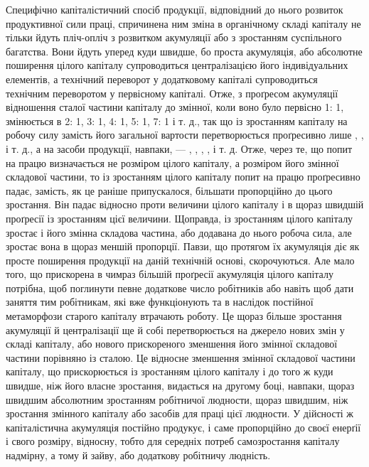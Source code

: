 Специфічно капіталістичний спосіб продукції, відповідний
до нього розвиток продуктивної сили праці, спричинена ним
зміна в органічному складі капіталу не тільки йдуть пліч-опліч
з розвитком акумуляції або з зростанням суспільного багатства.
Вони йдуть уперед куди швидше, бо проста акумуляція,
або абсолютне поширення цілого капіталу супроводиться централізацією
його індивідуальних елементів, а технічний переворот
у додатковому капіталі супроводиться технічним переворотом
у первісному капіталі. Отже, з проґресом акумуляції
відношення сталої частини капіталу до змінної, коли воно було
первісно 1: 1, змінюється в 2: 1, 3: 1, 4: 1, 5: 1, 7: 1 і т. д.,
так що із зростанням капіталу на робочу силу замість  його
загальної вартости перетворюється проґресивно лише , ,
   і т. д., а на засоби продукції, навпаки, — , , ,
,  і т. д. Отже, через те, що попит на працю визначається не
розміром цілого капіталу, а розміром його змінної складової
частини, то із зростанням цілого капіталу попит на працю проґресивно
падає, замість, як це раніше припускалося, більшати
пропорційно до цього зростання. Він падає відносно проти величини
цілого капіталу і в щораз швидшій проґресії із зростанням
цієї величини. Щоправда, із зростанням цілого капіталу зростає
і його змінна складова частина, або додавана до нього робоча
сила, але зростає вона в щораз меншій пропорції. Павзи, що протягом
їх акумуляція діє як просте поширення продукції на
даній технічній основі, скорочуються. Але мало того, що прискорена
в чимраз більшій проґресії акумуляція цілого капіталу
потрібна, щоб поглинути певне додаткове число робітників або
навіть щоб дати заняття тим робітникам, які вже функціонують
та в наслідок постійної метаморфози старого капіталу втрачають
роботу. Це щораз більше зростання акумуляції й централізації
ще й собі перетворюється на джерело нових змін у складі капіталу,
або нового прискореного зменшення його змінної складової
частини порівняно із сталою. Це відносне зменшення змінної
складової частини капіталу, що прискорюється із зростанням
цілого капіталу і до того ж куди швидше, ніж його власне зростання,
видається на другому боці, навпаки, щораз швидшим
абсолютним зростанням робітничої людности, щораз швидшим,
ніж зростання змінного капіталу або засобів для праці цієї людности.
У дійсності ж капіталістична акумуляція постійно продукує,
і саме пропорційно до своєї енерґії і свого розміру, відносну,
тобто для середніх потреб самозростання капіталу надмірну,
а тому й зайву, або додаткову робітничу людність.

